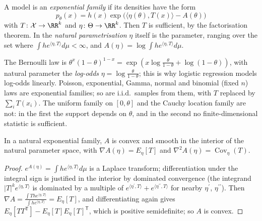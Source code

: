 \begin{definition}\label{statistics:definition-exponential-family}
A model is an \emph{exponential family} if its densities have the form
\[
p_\theta(x) = h(x)\exp\bigl(\langle\eta(\theta), T(x)\rangle - A(\theta)\bigr)
\]
with $T \colon \mathcal{X} \to \RR^k$ and $\eta \colon \Theta \to \RR^k$. Then $T$ is sufficient, by the factorisation theorem. In the \emph{natural parametrisation} $\eta$ itself is the parameter, ranging over the set where
$\int he^{\langle\eta, T\rangle}d\mu < \infty$, and $A(\eta) = \log\int he^{\langle\eta, T\rangle}d\mu$.
\end{definition}

\begin{example}\label{statistics:example-exponential-families}
The Bernoulli law is $\theta^x(1 - \theta)^{1-x} = \exp(x\log\frac{\theta}{1 - \theta} + \log(1 - \theta))$, with natural parameter the \emph{log-odds} $\eta = \log\frac{\theta}{1 - \theta}$; this is why logistic regression models log-odds
linearly. Poisson, exponential, Gamma, normal and binomial (fixed $n$) laws are exponential families; so are i.i.d.\ samples from them, with $T$ replaced by $\sum_iT(x_i)$. The uniform family on $[0, \theta]$ and the Cauchy
location family are not: in the first the support depends on $\theta$, and in the second no finite-dimensional statistic is sufficient.
\end{example}

\begin{proposition}\label{statistics:proposition-exponential-family-moments}
In a natural exponential family, $A$ is convex and smooth in the interior of the natural parameter space, with $\nabla A(\eta) = E_\eta[T]$ and $\nabla^2A(\eta) = \operatorname{Cov}_\eta(T)$.
\end{proposition}

\begin{proof}
$e^{A(\eta)} = \int he^{\langle\eta, T\rangle}d\mu$ is a Laplace transform; differentiation under the integral sign is justified in the interior by dominated convergence (the integrand $|T|^ke^{\langle\eta, T\rangle}$ is dominated by a multiple of
$e^{\langle\eta^{\prime}, T\rangle} + e^{\langle\eta^{\prime\prime}, T\rangle}$ for nearby $\eta^{\prime}$, $\eta^{\prime\prime}$). Then $\nabla A = \frac{\int Th e^{\langle\eta, T\rangle}}{\int he^{\langle\eta, T\rangle}} = E_\eta[T]$, and differentiating again gives
$E_\eta[TT^{\mathsf T}] - E_\eta[T]E_\eta[T]^{\mathsf T}$, which is positive semidefinite; so $A$ is convex.
\end{proof}

